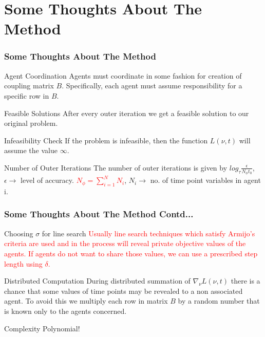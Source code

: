 \documentclass{beamer}
\newcommand\FontviNine{\fontsize{9}{7.2}\selectfont}
\begin{document}
\section{Some Thoughts About The Method}
\begin{frame}
\frametitle{Some Thoughts About The Method}
\FontviNine
\begin{block}{Agent Coordination}
Agents must coordinate in some fashion for creation of coupling matrix $B$. Specifically, each agent must assume responsibility for a specific row in $B$.
\end{block}

\begin{block}{Feasible Solutions}
After every outer iteration we get a feasible solution to our original problem. 
\end{block}

\begin{block}{Infeasibility Check}
If the problem is infeasible, then the function $L(\nu,t)$ will assume the value $\infty$.
\end{block}

\begin{block}{Number of Outer Iterations}
The number of outer iterations is given by $log_{\tau}{\frac{\epsilon}{N_{\phi} t_0}}$, $\epsilon \rightarrow$ level of accuracy. \textcolor{red}{$N_{\phi} = \sum_{i=1}^{N} N_i$}, $N_i \rightarrow$ no. of time point variables in agent i.
\end{block}
\end{frame}

\begin{frame}
\frametitle{Some Thoughts About The Method Contd...}
\FontviNine
\begin{block}{Choosing $\sigma$ for line search}
\textcolor{red}{Usually line search techniques which satisfy Armijo's criteria are used and in the process will reveal private objective values of the agents. If agents do not want to share those values, we can use a prescribed step length using $\delta$.}
\end{block}

\begin{block}{Distributed Computation}
During distributed summation of $\nabla_{\nu} L(\nu , t)$ there is a chance that some values of time points may be revealed to a non associated agent. To avoid this we multiply each row in matrix $B$ by a random number that is known only to the agents concerned.
\end{block}

\begin{block}{Complexity}
Polynomial!
\end{block}
\end{frame}
\end{document}
